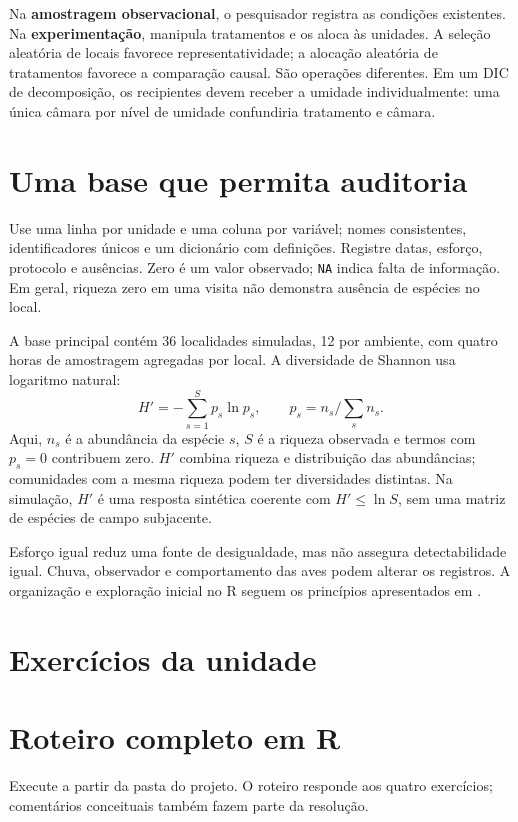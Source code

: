 Na \textbf{amostragem observacional}, o pesquisador registra as condições existentes. Na \textbf{experimentação}, manipula tratamentos e os aloca às unidades. A seleção aleatória de locais favorece representatividade; a alocação aleatória de tratamentos favorece a comparação causal. São operações diferentes. Em um DIC de decomposição, os recipientes devem receber a umidade individualmente: uma única câmara por nível de umidade confundiria tratamento e câmara.

\section{Uma base que permita auditoria}
Use uma linha por unidade e uma coluna por variável; nomes consistentes, identificadores únicos e um dicionário com definições. Registre datas, esforço, protocolo e ausências. Zero é um valor observado; \texttt{NA} indica falta de informação. Em geral, riqueza zero em uma visita não demonstra ausência de espécies no local.

A base principal contém 36 localidades simuladas, 12 por ambiente, com quatro horas de amostragem agregadas por local. A diversidade de Shannon usa logaritmo natural:
\begin{equation}H'=-\sum_{s=1}^{S}p_s\ln p_s,\qquad p_s=n_s/\sum_s n_s.\end{equation}
Aqui, $n_s$ é a abundância da espécie $s$, $S$ é a riqueza observada e termos com $p_s=0$ contribuem zero. $H'$ combina riqueza e distribuição das abundâncias; comunidades com a mesma riqueza podem ter diversidades distintas. Na simulação, $H'$ é uma resposta sintética coerente com $H'\leq\ln S$, sem uma matriz de espécies de campo subjacente.

Esforço igual reduz uma fonte de desigualdade, mas não assegura detectabilidade igual. Chuva, observador e comportamento das aves podem alterar os registros. A organização e exploração inicial no R seguem os princípios apresentados em \textcite{rintro}.

\section{Exercícios da unidade}
\begin{enumerate}
\end{enumerate}
\clearpage
\section{Roteiro completo em R}
Execute a partir da pasta do projeto. O roteiro responde aos quatro exercícios; comentários conceituais também fazem parte da resolução.

